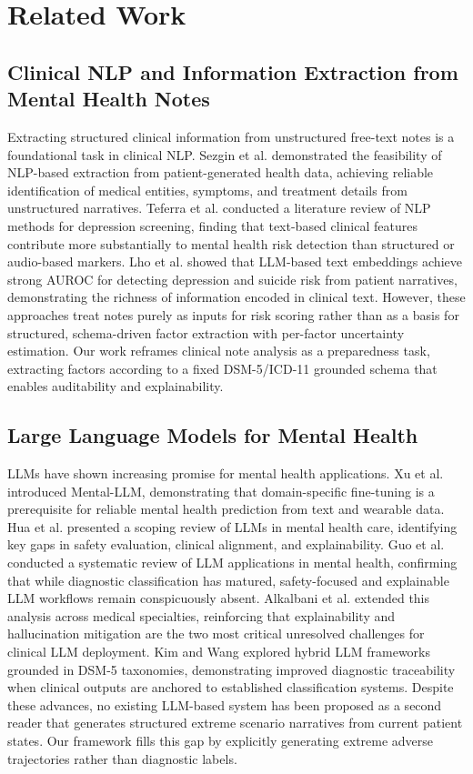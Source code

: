 \documentclass[conference]{IEEEtran}
\begin{document}
\section{Related Work}

\subsection{Clinical NLP and Information Extraction from Mental Health Notes}

Extracting structured clinical information from unstructured free-text notes is a foundational task in clinical NLP. Sezgin et al. \cite{b3} demonstrated the feasibility of NLP-based extraction from patient-generated health data, achieving reliable identification of medical entities, symptoms, and treatment details from unstructured narratives. Teferra et al. \cite{b15} conducted a literature review of NLP methods for depression screening, finding that text-based clinical features contribute more substantially to mental health risk detection than structured or audio-based markers. Lho et al. \cite{b16} showed that LLM-based text embeddings achieve strong AUROC for detecting depression and suicide risk from patient narratives, demonstrating the richness of information encoded in clinical text. However, these approaches treat notes purely as inputs for risk scoring rather than as a basis for structured, schema-driven factor extraction with per-factor uncertainty estimation. Our work reframes clinical note analysis as a preparedness task, extracting factors according to a fixed DSM-5/ICD-11 grounded schema that enables auditability and explainability.

\subsection{Large Language Models for Mental Health}

LLMs have shown increasing promise for mental health applications. Xu et al. \cite{b4} introduced Mental-LLM, demonstrating that domain-specific fine-tuning is a prerequisite for reliable mental health prediction from text and wearable data. Hua et al. \cite{b6} presented a scoping review of LLMs in mental health care, identifying key gaps in safety evaluation, clinical alignment, and explainability. Guo et al. \cite{b5} conducted a systematic review of LLM applications in mental health, confirming that while diagnostic classification has matured, safety-focused and explainable LLM workflows remain conspicuously absent. Alkalbani et al. \cite{b7} extended this analysis across medical specialties, reinforcing that explainability and hallucination mitigation are the two most critical unresolved challenges for clinical LLM deployment. Kim and Wang \cite{b17} explored hybrid LLM frameworks grounded in DSM-5 taxonomies, demonstrating improved diagnostic traceability when clinical outputs are anchored to established classification systems. Despite these advances, no existing LLM-based system has been proposed as a second reader that generates structured extreme scenario narratives from current patient states. Our framework fills this gap by explicitly generating extreme adverse trajectories rather than diagnostic labels.
\end{document}
